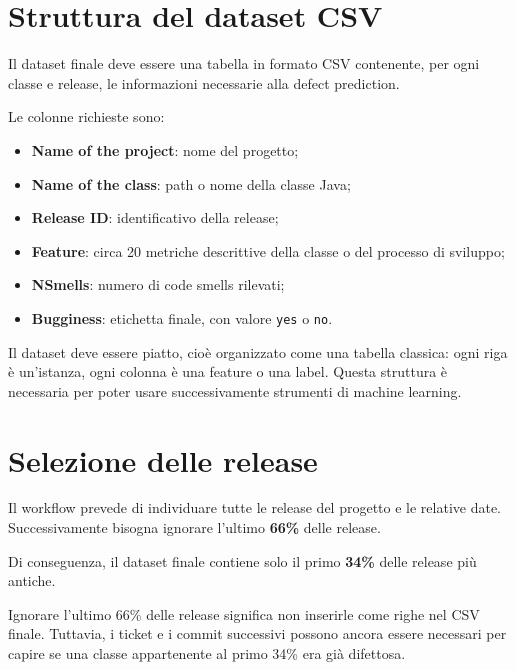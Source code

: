 \section{Struttura del dataset CSV}

Il dataset finale deve essere una tabella in formato CSV contenente, per ogni classe e release, le informazioni necessarie alla defect prediction.

Le colonne richieste sono:

\begin{itemize}
    \item \textbf{Name of the project}: nome del progetto;
    \item \textbf{Name of the class}: path o nome della classe Java;
    \item \textbf{Release ID}: identificativo della release;
    \item \textbf{Feature}: circa 20 metriche descrittive della classe o del processo di sviluppo;
    \item \textbf{NSmells}: numero di code smells rilevati;
    \item \textbf{Bugginess}: etichetta finale, con valore \texttt{yes} o \texttt{no}.
\end{itemize}

\begin{notaprof}
Il dataset deve essere piatto, cioè organizzato come una tabella classica: ogni riga è un'istanza, ogni colonna è una feature o una label. Questa struttura è necessaria per poter usare successivamente strumenti di machine learning.
\end{notaprof}

\section{Selezione delle release}

Il workflow prevede di individuare tutte le release del progetto e le relative date. Successivamente bisogna ignorare l'ultimo \textbf{66\%} delle release.

Di conseguenza, il dataset finale contiene solo il primo \textbf{34\%} delle release più antiche.

\begin{notaesame}
Ignorare l'ultimo 66\% delle release significa non inserirle come righe nel CSV finale. Tuttavia, i ticket e i commit successivi possono ancora essere necessari per capire se una classe appartenente al primo 34\% era già difettosa.
\end{notaesame}

